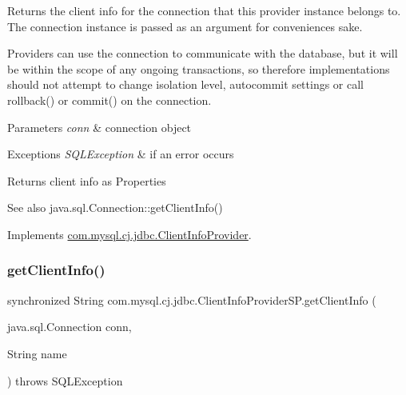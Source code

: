Returns the client info for the connection that this provider instance belongs to. The connection instance is passed as an argument for convenience\textquotesingle{}s sake.

Providers can use the connection to communicate with the database, but it will be within the scope of any ongoing transactions, so therefore implementations should not attempt to change isolation level, autocommit settings or call rollback() or commit() on the connection.


\begin{DoxyParams}{Parameters}
{\em conn} & connection object \\
\hline
\end{DoxyParams}

\begin{DoxyExceptions}{Exceptions}
{\em S\+Q\+L\+Exception} & if an error occurs \\
\hline
\end{DoxyExceptions}
\begin{DoxyReturn}{Returns}
client info as Properties 
\end{DoxyReturn}
\begin{DoxySeeAlso}{See also}
java.\+sql.\+Connection\+::get\+Client\+Info() 
\end{DoxySeeAlso}


Implements \mbox{\hyperlink{interfacecom_1_1mysql_1_1cj_1_1jdbc_1_1_client_info_provider_ac0bf93f0436618158753cb1f7ce7b463}{com.\+mysql.\+cj.\+jdbc.\+Client\+Info\+Provider}}.

\mbox{\label{classcom_1_1mysql_1_1cj_1_1jdbc_1_1_client_info_provider_s_p_a64004310beae80de1724f7523a5d6337}} 
\subsubsection{\texorpdfstring{get\+Client\+Info()}{getClientInfo()}\hspace{0.1cm}{\footnotesize\ttfamily [2/2]}}
{\footnotesize\ttfamily synchronized String com.\+mysql.\+cj.\+jdbc.\+Client\+Info\+Provider\+S\+P.\+get\+Client\+Info (\begin{DoxyParamCaption}\item[{java.\+sql.\+Connection}]{conn,  }\item[{String}]{name }\end{DoxyParamCaption}) throws S\+Q\+L\+Exception}

